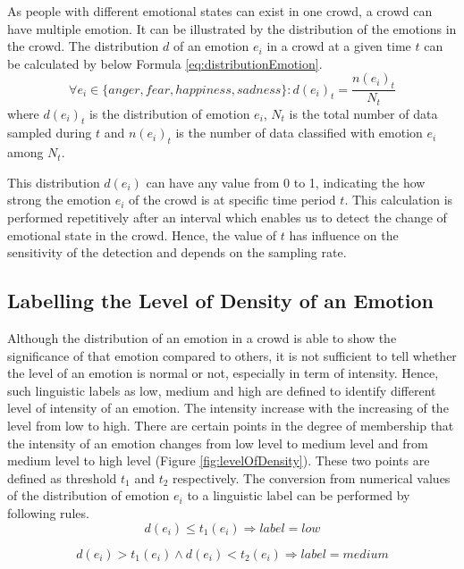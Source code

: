As people with different emotional states can exist in one crowd, a crowd can have multiple emotion. It can be illustrated by the distribution of the emotions in the crowd. The distribution \(d\) of an emotion \(e_i\) in a crowd at a given time \(t\) can be calculated by below Formula \ref{eq:distributionEmotion}.
\begin{equation}
\label{eq:distributionEmotion}
	\forall e_i \in \{anger, fear, happiness, sadness\}: d(e_i)_t = \frac{n(e_i)_t}{N_t}
\end{equation}
where \(d(e_i)_t\) is the distribution of emotion \(e_i\), \(N_t\) is the total number of data sampled during \(t\) and \(n(e_i)_t\) is the number of data classified with emotion \(e_i\) among \(N_t\).

This distribution \(d(e_i)\) can have any value from 0 to 1, indicating the how strong the emotion \(e_i\) of the crowd is at specific time period \(t\). This calculation is performed repetitively after an interval which enables us to detect the change of emotional state in the crowd. Hence, the value of \(t\) has influence on the sensitivity of the detection and depends on the sampling rate.

\subsection{Labelling the Level of Density of an Emotion}
Although the distribution of an emotion in a crowd is able to show the significance of that emotion compared to others, it is not sufficient to tell whether the level of an emotion is normal or not, especially in term of intensity. Hence, such linguistic labels as low, medium and high are defined to identify different level of intensity of an emotion. The intensity increase with the increasing of the level from low to high. There are certain points in the degree of membership that the intensity of an emotion changes from low level to medium level and from medium level to high level (Figure \ref{fig:levelOfDensity}). These two points are defined as threshold \(t_1\) and \(t_2\) respectively. The conversion from numerical values of the distribution of emotion \(e_i\) to a linguistic label can be performed by following rules.
\begin{equation}
\label{eq:lowDensityEmotion}
d(e_i) \leq t_1(e_i) \Rightarrow label = low
\end{equation}

\begin{equation}
\label{eq:mediumDensityEmotion}
d(e_i) > t_1(e_i) \land d(e_i) < t_2(e_i) \Rightarrow label = medium
\end{equation}

